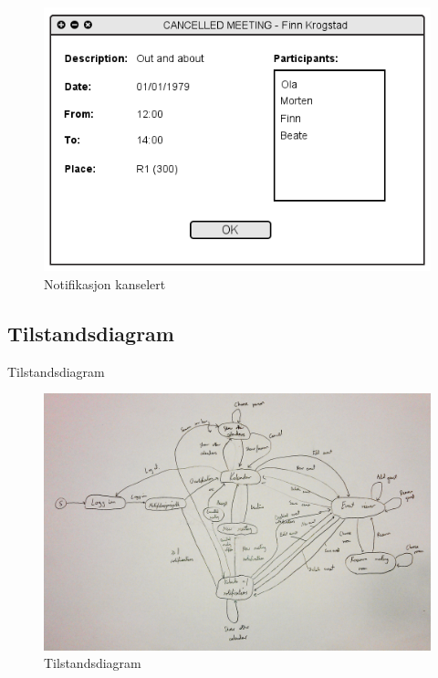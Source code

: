 \begin{figure}[H]
\centering
\includegraphics[scale=0.65]{images/notifikasjon_kanselert.png}
\caption{Notifikasjon kanselert}
\label{notifikasjon_kanselert_image}
\end{figure}


\subsection{Tilstandsdiagram}
Tilstandsdiagram

\begin{figure}[H]
\centering
\includegraphics[scale=0.165]{images/tilstandsdiagram.jpg}
\caption{Tilstandsdiagram}
\label{tilstandsdiagram_image}
\end{figure}